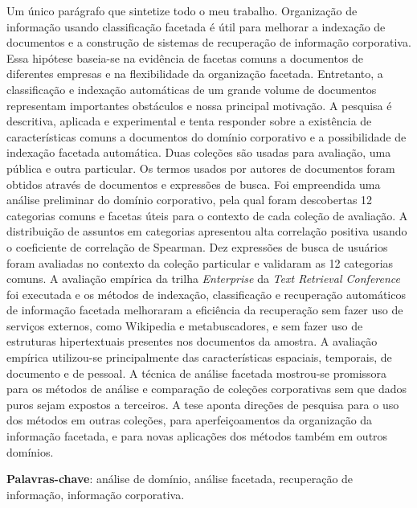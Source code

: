 \begin{resumo}

    \noindent 
        Um único parágrafo que sintetize todo o meu trabalho. Organização de informação usando classificação facetada é útil para melhorar a indexação de documentos e a construção de sistemas de recuperação de informação corporativa. Essa hipótese baseia-se na evidência de facetas comuns a documentos de diferentes empresas e na flexibilidade da organização facetada. Entretanto, a classificação e indexação automáticas de um grande volume de documentos representam importantes obstáculos e nossa principal motivação. A pesquisa é descritiva, aplicada e experimental e tenta responder sobre a existência de características comuns a documentos do domínio corporativo e a possibilidade de indexação facetada automática. Duas coleções são usadas para avaliação, uma pública e outra particular. Os termos usados por autores de documentos foram obtidos através de documentos e expressões de busca. Foi empreendida uma análise preliminar do domínio corporativo, pela qual foram descobertas 12 categorias comuns e facetas úteis para o contexto de cada coleção de avaliação. A distribuição de assuntos em categorias apresentou alta correlação positiva usando o coeficiente de correlação de Spearman. Dez expressões de busca de usuários foram avaliadas no contexto da coleção particular e validaram as 12 categorias comuns. A avaliação empírica da trilha \textit{Enterprise} da \textit{Text Retrieval Conference} foi executada e os métodos de indexação, classificação e recuperação automáticos de informação facetada melhoraram a eficiência da recuperação sem fazer uso de serviços externos, como Wikipedia e metabuscadores, e sem fazer uso de estruturas hipertextuais presentes nos documentos da amostra. A avaliação empírica utilizou-se principalmente das características espaciais, temporais, de documento e de pessoal. A técnica de análise facetada mostrou-se promissora para os métodos de análise e comparação de coleções corporativas sem que dados puros sejam expostos a terceiros. A tese aponta direções de pesquisa para o uso dos métodos em outras coleções, para aperfeiçoamentos da organização da informação facetada, e para novas aplicações dos métodos também em outros domínios.
    \noindent 

    \textbf{Palavras-chave}: análise de domínio, análise facetada, recuperação de informação, informação corporativa.

\end{resumo}
